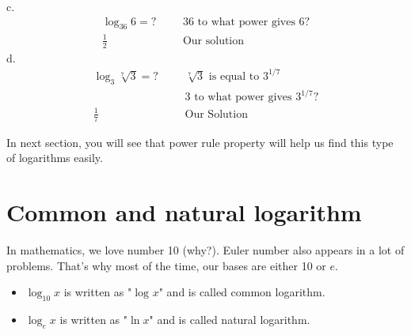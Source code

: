%
c. \begin{align*}
	  \log_{36}6 =?&            &       &\text{36 to what power gives 6?}\\
	  \frac{1}{2}&          	&       &\text{Our solution}
\end{align*}
%
d. \begin{align*}
	  \log_{3}\sqrt[7]{3}=?&       &   &\text{$\sqrt[7]{3}$ is equal to $3^{1/7}$}\\
	  &&						       &\text{3 to what power gives $3^{1/7}$?}\\
	  \frac{1}{7}&	&                  &\text{Our Solution}
\end{align*}
\begin{nt}
    In next section, you will see that power rule property will help us find this type of logarithms easily.  
\end{nt}
\section{Common and natural logarithm}
In mathematics, we love number 10 (why?). Euler number also appears in a lot of problems.
That's why most of the time, our bases are either 10 or $e$. 
	\begin{tcolorbox}[title=log and ln, fonttitle=\bfseries,
	                  colframe=blue!75!black,
	                  colback=white]
		\begin{itemize}
			\item $\log_{10}x$ is written as "$\log_{}x$" and is called common logarithm.
			\item $\log_{e}x$ is written as "$\ln{x}$" and is called natural logarithm.
		\end{itemize}
	\end{tcolorbox}
